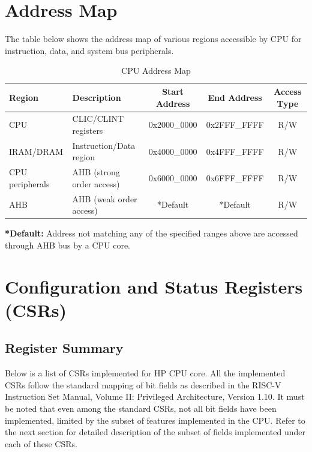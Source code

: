 \documentclass[main\_\_EN.tex]{subfiles}
\begin{document}
\section{Address Map}
The table below shows the address map of various regions accessible by CPU for instruction, data, and system bus peripherals.

\begin{longtable}{| l| l |c | c | c  |}
\caption{CPU Address Map} \label{tab:riscvcpu-mem-blocks}
\\ \hline
\rowcolor{lightgray}
\textbf{Region} & \textbf{Description}    & \textbf{Start Address}  & \textbf{End Address}  & \textbf{Access Type}   \\ \hline
CPU \label{cpu} &  CLIC/CLINT registers &      0x2000\_0000  &  0x2FFF\_FFFF  &  R/W  \\ \hline
IRAM/DRAM\label{ram} & Instruction/Data region &   0x4000\_0000  &  0x4FFF\_FFFF  &  R/W  \\ \hline
CPU peripherals \label{cpu_peri} & AHB (strong order access)  &      0x6000\_0000  &  0x6FFF\_FFFF  &  R/W  \\ \hline
AHB\label{sysahb} & AHB (weak order access) &      *Default  &  *Default  &  R/W  \\ \hline
\end{longtable}

\textbf{*Default:} Address not matching any of the specified ranges above are accessed through AHB bus by a CPU core.


\section{Configuration and Status Registers (CSRs)}
\hypertarget{riscvcpu-cpu-reg-summ}{}
\subsection{Register Summary}
\label{sec:riscvcpu-cpu-reg-summ}

Below is a list of CSRs implemented for HP CPU core. All the implemented CSRs follow the standard mapping of bit fields as described in the RISC-V Instruction Set Manual, Volume II: Privileged Architecture, Version 1.10. It must be noted that even among the standard CSRs, not all bit fields have been implemented, limited by the subset of features implemented in the CPU. Refer to the next section for detailed description of the subset of fields implemented under each of these CSRs.
\end{document}
